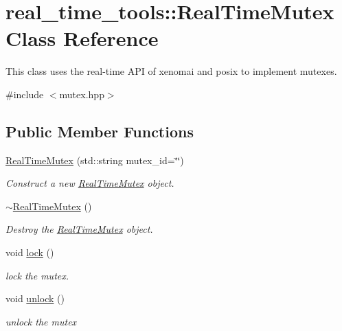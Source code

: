 \hypertarget{classreal__time__tools_1_1RealTimeMutex}{}\section{real\+\_\+time\+\_\+tools\+:\+:Real\+Time\+Mutex Class Reference}
\label{classreal__time__tools_1_1RealTimeMutex}


This class uses the real-\/time A\+PI of xenomai and posix to implement mutexes.  




{\ttfamily \#include $<$mutex.\+hpp$>$}

\subsection*{Public Member Functions}
\begin{DoxyCompactItemize}
\item 
\mbox{\label{classreal__time__tools_1_1RealTimeMutex_aef1777e27f3f2802ebcc7cb6db101df0}} 
\hyperlink{classreal__time__tools_1_1RealTimeMutex_aef1777e27f3f2802ebcc7cb6db101df0}{Real\+Time\+Mutex} (std\+::string mutex\+\_\+id=\char`\"{}\char`\"{})
\begin{DoxyCompactList}\small\item\em Construct a new \hyperlink{classreal__time__tools_1_1RealTimeMutex}{Real\+Time\+Mutex} object. \end{DoxyCompactList}\item 
\mbox{\label{classreal__time__tools_1_1RealTimeMutex_a86c9ab73fb02cf4a954735d56f4f23ed}} 
\hyperlink{classreal__time__tools_1_1RealTimeMutex_a86c9ab73fb02cf4a954735d56f4f23ed}{$\sim$\+Real\+Time\+Mutex} ()
\begin{DoxyCompactList}\small\item\em Destroy the \hyperlink{classreal__time__tools_1_1RealTimeMutex}{Real\+Time\+Mutex} object. \end{DoxyCompactList}\item 
\mbox{\label{classreal__time__tools_1_1RealTimeMutex_a38d84501c3929f8dbb3c884299cfcb9c}} 
void \hyperlink{classreal__time__tools_1_1RealTimeMutex_a38d84501c3929f8dbb3c884299cfcb9c}{lock} ()
\begin{DoxyCompactList}\small\item\em lock the mutex. \end{DoxyCompactList}\item 
\mbox{\label{classreal__time__tools_1_1RealTimeMutex_a9b85b1aa898c22197dffc3958e0ec60c}} 
void \hyperlink{classreal__time__tools_1_1RealTimeMutex_a9b85b1aa898c22197dffc3958e0ec60c}{unlock} ()
\begin{DoxyCompactList}\small\item\em unlock the mutex \end{DoxyCompactList}\end{DoxyCompactItemize}

